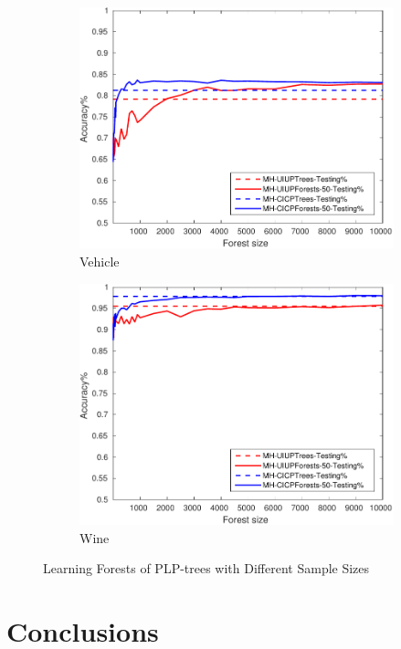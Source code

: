 \begin{figure}[ht]
\begin{subfigure}[b]{0.3\textwidth}
  	\includegraphics[width=\textwidth]{figs/PLPTF/Forests/VehicleDownsampledFurther_Forests_MH.pdf}
  	\caption{Vehicle}
		\label{fig:V4}
	\end{subfigure}
  \begin{subfigure}[b]{0.3\textwidth}
		\centering
  	\includegraphics[width=\textwidth]{figs/PLPTF/Forests/WineDownsampled_Forests_MH.pdf}
  	\caption{Wine}
		\label{fig:W4}
	\end{subfigure}

  \caption{Learning Forests of PLP-trees with Different Sample Sizes}
  \label{fig:forests2}
\end{figure}


\section{Conclusions}

